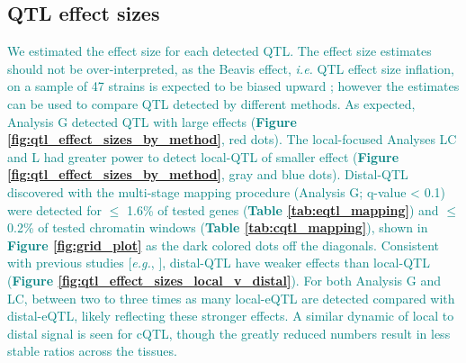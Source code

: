 \documentclass[9pt,twocolumn,twoside]{gsajnl}
\newcommand{\eg}{\emph{e.g.}\xspace}
\newcommand{\ie}{\emph{i.e.}\xspace}
\newcommand{\WV}[2]{\textcolor{red}{#1\footnote{\textcolor{red}{WV: #2}}}}
\newcommand{\GKinline}[1]{\textcolor{teal}{#1}}
\begin{document}
\subsection{QTL effect sizes}

\GKinline{We estimated the effect size for each detected QTL. The effect size estimates should not be over-interpreted, as the Beavis effect, \ie QTL effect size inflation, on a sample of 47 strains is expected to be biased upward \citep{Keele2019}; however the estimates can be used to compare QTL detected by different methods.}
\GKinline{As expected, Analysis G detected QTL with large effects (\textbf{Figure \ref{fig:qtl_effect_sizes_by_method}}, red dots). The local-focused Analyses LC and L had greater power to detect local-QTL of smaller effect (\textbf{Figure \ref{fig:qtl_effect_sizes_by_method}}, gray and blue dots). Distal-QTL discovered with the multi-stage mapping procedure (Analysis G; q-value < 0.1) were detected for $\leq$ 1.6\% of tested genes (\textbf{Table \ref{tab:eqtl_mapping}}) and $\leq$ 0.2\% of tested chromatin windows (\textbf{Table \ref{tab:cqtl_mapping}}), shown in \textbf{Figure \ref{fig:grid_plot}} as the dark colored dots off the diagonals. Consistent with previous studies [\eg, \citet{Chick2016}], distal-QTL have weaker effects than local-QTL (\textbf{Figure \ref{fig:qtl_effect_sizes_local_v_distal}}).} 
\GKinline{For both Analysis G and LC, between two to three times as many local-eQTL are detected compared with
distal-eQTL, likely reflecting these stronger effects. A similar dynamic of local to distal signal is seen for cQTL, though the greatly reduced numbers result in less stable ratios across the tissues.}
\end{document}
